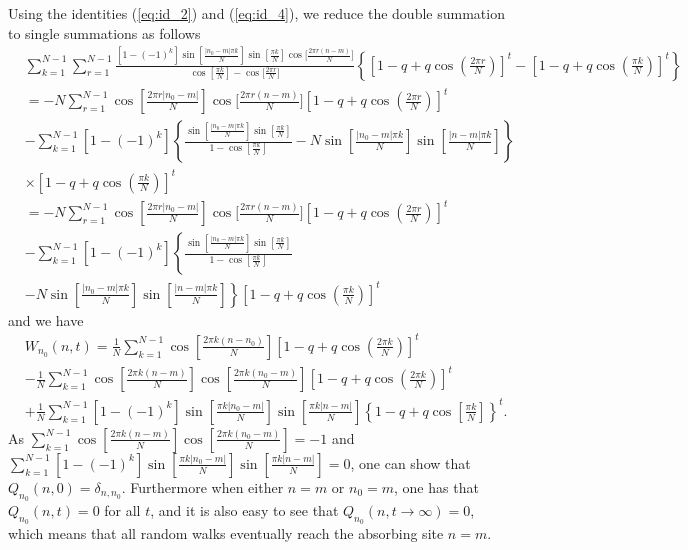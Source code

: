 \documentclass[idelinks, superscriptaddress, amsmath, amssymb, aps, pre]{revtex4-2}
\begin{document}
Using the identities (\ref{eq:id_2}) and (\ref{eq:id_4}), we reduce the double summation to single summations as follows
\begin{align}
&\sum_{k=1}^{N-1}\sum_{r=1}^{N-1}\frac{\left[1-(-1)^k\right]\sin\left[\frac{|n_0-m|\pi k}{N}\right]\sin\left[\frac{\pi k}{N}\right]\cos\Big[\frac{2\pi r (n-m)}{N}\Big]}{\cos\left[\frac{\pi k}{N}\right]-\cos\Big[\frac{2\pi r}{N}\Big]}\left\{\left[1-q+q\cos\left(\frac{2\pi r}{N}\right)\right]^t-\left[1-q+q\cos\left(\frac{\pi k}{N}\right)\right]^t\right\} \nonumber \\
&=-N\sum_{r=1}^{N-1}\cos\left[\frac{2\pi r|n_0-m|}{N}\right]\cos\Big[\frac{2\pi r (n-m)}{N}\Big]\left[1-q+q\cos\left(\frac{2\pi r}{N}\right)\right]^t \nonumber \\
&-\sum_{k=1}^{N-1}\left[1-(-1)^k\right]\left\{\frac{\sin\left[\frac{|n_0-m|\pi k}{N}\right]\sin\left[\frac{\pi k}{N}\right]}{1-\cos\left[\frac{\pi k}{N}\right]}-N\sin\left[\frac{|n_0-m|\pi k}{N}\right]\sin\left[\frac{|n-m|\pi k}{N}\right]\right\}\nonumber \\
&\times \left[1-q+q\cos\left(\frac{\pi k}{N}\right)\right]^t\nonumber \\
&=-N\sum_{r=1}^{N-1}\cos\left[\frac{2\pi r|n_0-m|}{N}\right]\cos\Big[\frac{2\pi r (n-m)}{N}\Big]\left[1-q+q\cos\left(\frac{2\pi r}{N}\right)\right]^t \nonumber \\
&-\sum_{k=1}^{N-1}\left[1-(-1)^k\right]\left\{\frac{\sin\left[\frac{|n_0-m|\pi k}{N}\right]\sin\left[\frac{\pi k}{N}\right]}{1-\cos\left[\frac{\pi k}{N}\right]}\right. \nonumber \\
&\left.-N\sin\left[\frac{|n_0-m|\pi k }{N}\right]\sin\left[\frac{|n-m|\pi k}{N}\right]\right\}\left[1-q+q\cos\left(\frac{\pi k }{N}\right)\right]^t
\end{align}
and we have
\begin{align}
&W_{n_0}(n,t)= \frac{1}{N}\sum_{k=1}^{N-1}\cos\left[\frac{2\pi k (n-n_0)}{N}\right]\left[1-q+q\cos\left(\frac{2\pi k}{N}\right)\right]^t \nonumber \\
&-   \frac{1}{N}\sum_{k=1}^{N-1}\cos\left[\frac{2\pi k (n-m)}{N}\right]\cos\left[\frac{2\pi k (n_0-m)}{N}\right]\left[1-q+q\cos\left(\frac{2\pi k}{N}\right)\right]^t\    \nonumber \\
&+\frac{1}{N}\sum_{k=1}^{N-1}\left[1-(-1)^k\right]\sin\left[\frac{\pi k |n_0-m|}{N}\right]\sin\left[\frac{\pi k |n-m|}{N}\right]\left\{1-q+q\cos\left[\frac{ \pi k}{N}\right]\right\}^t.
\label{eq:prob-time}
\end{align}
As $\sum_{k=1}^{N-1}\cos\left[\frac{2\pi k (n-m)}{N}\right]\cos\left[\frac{2\pi k (n_0-m)}{N}\right]=-1$ and $\sum_{k=1}^{N-1}\left[1-(-1)^k\right]\sin\left[\frac{\pi k |n_0-m|}{N}\right]\sin\left[\frac{\pi k |n-m|}{N}\right]=0$, one can show that $Q_{n_0}(n,0)=\delta_{n,n_0}$. Furthermore when either $n=m$ or $n_0=m$, one has that $Q_{n_0}(n,t)=0$ for all $t$, and it is also easy to see that $Q_{n_0}(n,t\to \infty)=0$, which means that all random walks eventually reach the absorbing site $n=m$.
\end{document}
